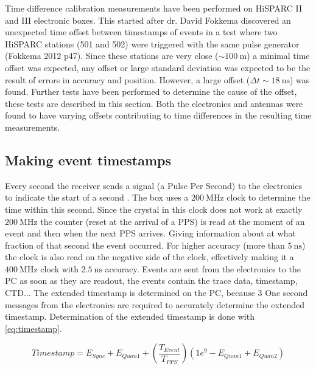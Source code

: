 Time difference calibration measurements have been performed on HiSPARC II and III electronic boxes. This started after dr. David Fokkema discovered an unexpected time offset between timestamps of events in a test where two HiSPARC stations (501 and 502) were triggered with the same pulse generator (Fokkema 2012 p47). Since these stations are very close ($\sim\SI{100}{\meter}$) a minimal time offset was expected, any offset or large standard deviation was expected to be the result of errors in \gps accuracy and position. However, a large offset ($\Delta t \sim\SI{18}{\ns}$) was found. Further tests have been performed to determine the cause of the offset, these tests are described in this section. Both the \hisparc electronics and \gps antennas were found to have varying offsets contributing to time differences in the resulting time measurements.


\subsection{Making event timestamps}
\label{sub:gps_timestamps}

Every second the \gps receiver sends a signal (a Pulse Per Second) to the \hisparc electronics to indicate the start of a second \cite{verkooijen2008firmware}. The \hisparc box uses a $\SI{200}{\mega\hertz}$ clock to determine the time within this second. Since the crystal in this clock does not work at exactly $\SI{200}{\mega\hertz}$ the counter (reset at the arrival of a PPS) is read at the moment of an event and then when the next PPS arrives. Giving information about at what fraction of that second the event occurred. For higher accuracy (more than $\SI{5}{\ns}$) the clock is also read on the negative side of the clock, effectively making it a $\SI{400}{\mega\hertz}$ clock with $\SI{2.5}{\ns}$ accuracy. Events are sent from the \hisparc electronics to the PC as soon as they are readout, the events contain the trace data, timestamp, CTD... The extended timestamp is determined on the PC, because 3 One second messages from the electronics are required to accurately determine the extended timestamp. Determination of the extended timestamp is done with \cref{eq:timestamp}.

\begin{equation}
\label{eq:timestamp}
    Timestamp = E_{Sync} + E_{Quan1} + \left(\frac{T_{Event}}{T_{PPS}}\right)
                 \left(1e^9 - E_{Quan1} + E_{Quan2}\right)
\end{equation}


